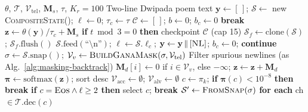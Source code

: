 \begin{algorithm}[H]
\caption{Strategy~3: Hybrid (Mask + Rejection)}
\label{alg:hybrid}
\scriptsize
\begin{algorithmic}[1]
\Require $\theta$, $\mathcal{T}$, $\mathcal{V}_{\text{tel}}$,
         $\mathbf{M}_s$, $\tau$, $K_r{=}100$
\Ensure Two-line Dwipada poem text
\State $\mathbf{y} \gets [\,]$;\;
       $\mathcal{S} \gets$ new \textsc{CompositeState}();\;
       $\ell \gets 0$;\; $\tau_c \gets \tau$
\State $\mathcal{C} \gets [\,]$;\;
       $b \gets 0$;\; $b_c \gets 0$
     \textbf{break} \EndIf
    \State $\mathbf{z} \gets \theta(\mathbf{y})/\tau_c
           + \mathbf{M}_s$
    \State \textbf{if} $t \bmod 3 = 0$
           \textbf{then} checkpoint
           $\mathcal{C}$ (cap 15)
    \State {}
    \State $\mathcal{S}_f \gets \text{clone}(\mathcal{S})$;\;
           $\mathcal{S}_f.\text{flush}()$
        \State $\mathcal{S}.\text{feed}(
               \text{``\textbackslash n''})$;\;
               $\ell \gets \mathcal{S}.\ell_c$;\;
               $\mathbf{y} \gets \mathbf{y} \,\|\,
               [\textsc{NL}]$;\;
               $b_c \gets 0$;\;
               \textbf{continue}
    \EndIf
    \State {}
    \State $\sigma \gets \mathcal{S}.\text{snap}()$;\;
           $\mathcal{V}_v \gets
           \textsc{BuildGanaMask}(\sigma,
           \mathcal{V}_{\text{tel}})$
    \State Filter spurious newlines
           (as Alg.~\ref{alg:masking-backtrack})
    \State $\mathbf{M}_d[i] \gets 0$ if
           $i \in \mathcal{V}_v$, else $-\infty$;\;
           $\mathbf{z} \gets \mathbf{z} + \mathbf{M}_d$
    \State $\boldsymbol{\pi} \gets
           \text{softmax}(\mathbf{z})$;\;
           sort desc
    \State {}
    \State $\mathcal{V}_{\text{acc}} \gets \emptyset$;\;
           $\mathcal{V}_{\text{alv}} \gets \emptyset$
        \State $c \gets \pi_k$;\;
               \textbf{if} $\boldsymbol{\pi}(c) < 10^{-8}$
               \textbf{then break}
        \State \textbf{if} $c = \textsc{Eos} \wedge
               \ell \ge 2$ \textbf{then} select $c$;
               \textbf{break}
        \State {}
        \State $\mathcal{S}' \gets
               \textsc{FromSnap}(\sigma)$
        \State \textbf{for each} ch $\in
               \mathcal{T}.\text{dec}(c)$

\end{algorithmic}
\end{algorithm}
